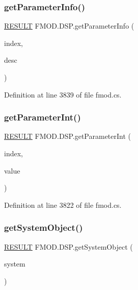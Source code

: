 \subsubsection{\texorpdfstring{get\+Parameter\+Info()}{getParameterInfo()}}
{\footnotesize\ttfamily \hyperlink{namespace_f_m_o_d_a305d1176ef3f8c8815861a60407ac33d}{R\+E\+S\+U\+LT} F\+M\+O\+D.\+D\+S\+P.\+get\+Parameter\+Info (\begin{DoxyParamCaption}\item[{int}]{index,  }\item[{out \hyperlink{struct_f_m_o_d_1_1_d_s_p___p_a_r_a_m_e_t_e_r___d_e_s_c}{D\+S\+P\+\_\+\+P\+A\+R\+A\+M\+E\+T\+E\+R\+\_\+\+D\+E\+SC}}]{desc }\end{DoxyParamCaption})}



Definition at line 3839 of file fmod.\+cs.

\mbox{\label{class_f_m_o_d_1_1_d_s_p_a93b5432794048642c905e41eaeb3566c}} 
\subsubsection{\texorpdfstring{get\+Parameter\+Int()}{getParameterInt()}}
{\footnotesize\ttfamily \hyperlink{namespace_f_m_o_d_a305d1176ef3f8c8815861a60407ac33d}{R\+E\+S\+U\+LT} F\+M\+O\+D.\+D\+S\+P.\+get\+Parameter\+Int (\begin{DoxyParamCaption}\item[{int}]{index,  }\item[{out int}]{value }\end{DoxyParamCaption})}



Definition at line 3822 of file fmod.\+cs.

\mbox{\label{class_f_m_o_d_1_1_d_s_p_a01c133af7873b83bee48889f2f075bf0}} 
\subsubsection{\texorpdfstring{get\+System\+Object()}{getSystemObject()}}
{\footnotesize\ttfamily \hyperlink{namespace_f_m_o_d_a305d1176ef3f8c8815861a60407ac33d}{R\+E\+S\+U\+LT} F\+M\+O\+D.\+D\+S\+P.\+get\+System\+Object (\begin{DoxyParamCaption}\item[{out \hyperlink{class_f_m_o_d_1_1_system}{System}}]{system }\end{DoxyParamCaption})}



